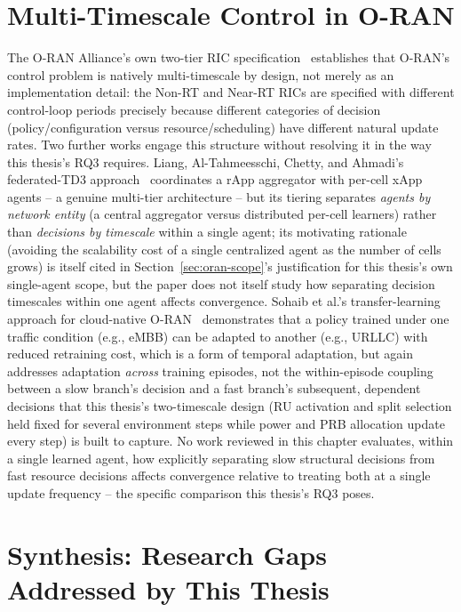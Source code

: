 \section{Multi-Timescale Control in O-RAN}
\label{sec:lit-multitimescale}

The O-RAN Alliance's own two-tier RIC specification~\cite{oran2021mvp}
establishes that O-RAN's control problem is natively multi-timescale by
design, not merely as an implementation detail: the Non-RT and Near-RT RICs
are specified with different control-loop periods precisely because
different categories of decision (policy/configuration versus
resource/scheduling) have different natural update rates. Two further works
engage this structure without resolving it in the way this thesis's RQ3
requires. Liang, Al-Tahmeesschi, Chetty, and Ahmadi's federated-TD3
approach~\cite{liang2026federated} coordinates a rApp aggregator with
per-cell xApp agents -- a genuine multi-tier architecture -- but its
tiering separates \emph{agents by network entity} (a central aggregator
versus distributed per-cell learners) rather than \emph{decisions by
timescale} within a single agent; its motivating rationale (avoiding the
scalability cost of a single centralized agent as the number of cells
grows) is itself cited in Section~\ref{sec:oran-scope}'s justification for
this thesis's own single-agent scope, but the paper does not itself study
how separating decision timescales within one agent affects convergence.
Sohaib et al.'s transfer-learning approach for cloud-native
O-RAN~\cite{sohaib2024transfer} demonstrates that a policy trained under one
traffic condition (e.g., eMBB) can be adapted to another (e.g., URLLC) with
reduced retraining cost, which is a form of temporal adaptation, but again
addresses adaptation \emph{across} training episodes, not the
within-episode coupling between a slow branch's decision and a fast
branch's subsequent, dependent decisions that this thesis's two-timescale
design (RU activation and split selection held fixed for several
environment steps while power and PRB allocation update every step) is
built to capture. No work reviewed in this chapter evaluates, within a
single learned agent, how explicitly separating slow structural decisions
from fast resource decisions affects convergence relative to treating both
at a single update frequency -- the specific comparison this thesis's RQ3
poses.

\section{Synthesis: Research Gaps Addressed by This Thesis}
\label{sec:lit-synthesis}

